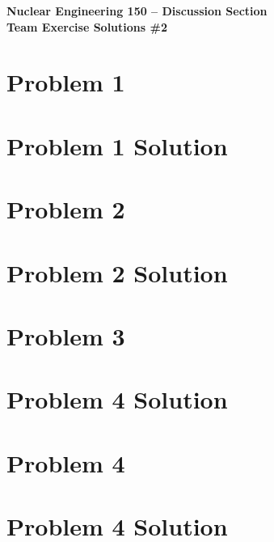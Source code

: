 \documentclass{report}
\begin{document}
\begin{center}
\textbf{\large Nuclear Engineering 150 -- Discussion Section}\\ 
\textbf{Team Exercise Solutions \#2}
\end{center}


\section*{Problem 1}

\section*{Problem 1 Solution}



\newpage
\section*{Problem 2}

\section*{Problem 2 Solution}



\newpage
\section*{Problem 3}

\section*{Problem 4 Solution}



\newpage
\section*{Problem 4}

\section*{Problem 4 Solution}
\end{document}
